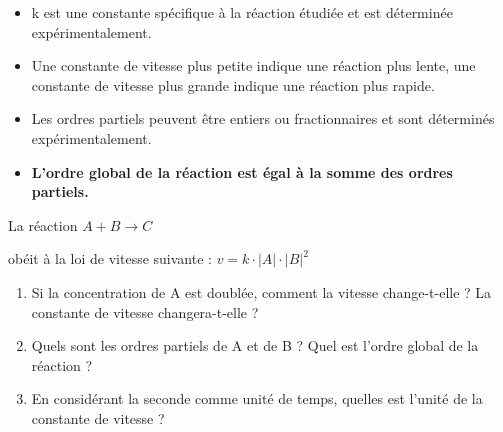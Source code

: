 \documentclass[
  11pt,
  french,
  a4paper,
  openany]{book}
\providecommand{\tightlist}{%
  \setlength{\itemsep}{0pt}\setlength{\parskip}{0pt}}
\begin{document}
\begin{itemize}
\tightlist
\item
  k est une constante spécifique à la réaction étudiée et est déterminée expérimentalement.
\item
  Une constante de vitesse plus petite indique une réaction plus lente, une constante de vitesse plus grande indique une réaction plus rapide.
\item
  Les ordres partiels peuvent être entiers ou fractionnaires et sont déterminés expérimentalement.
\item
  \textbf{L'ordre global de la réaction est égal à la somme des ordres partiels.}
\end{itemize}

\begin{Exercise}

La réaction \(A + B \rightarrow C\)

obéit à la loi de vitesse suivante : \(v = k \cdot |A| \cdot |B|^2\)

\begin{enumerate}
\def\labelenumi{\arabic{enumi}.}
\tightlist
\item
  Si la concentration de A est doublée, comment la vitesse change-t-elle ? La constante de vitesse changera-t-elle ?
\item
  Quels sont les ordres partiels de A et de B ? Quel est l'ordre global de la réaction ?
\item
  En considérant la seconde comme unité de temps, quelles est l'unité de la constante de vitesse ?
\end{enumerate}


\end{Exercise}
\end{document}
